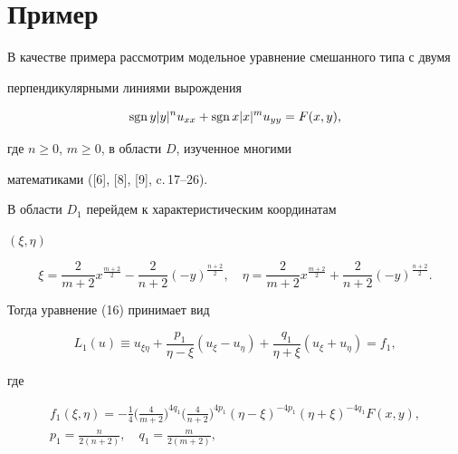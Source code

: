 \section{Пример}





В качестве примера рассмотрим модельное уравнение смешанного типа с двумя 


перпендикулярными линиями вырождения


\begin{equation}


\sgn y|y|^nu_{xx}+\sgn x|x|^mu_{yy}=F(x,y),


\end{equation}


где $n\ge 0$, $m\ge 0$, в области $D$, изученное многими


математиками ([6], [8], [9], c.\,17--26).





В области $D_1$ перейдем к характеристическим координатам


$(\xi,\eta)$


$$


\xi=\frac{2}{m+2}x^{\frac{m+2}{2}}-\frac{2}{n+2}


(-y)^{\frac{n+2}{2}},\quad \eta 


=\frac{2}{m+2}x^{\frac{m+2}{2}}+\frac{2}{n+2}(-y)^{\frac{n+2}{2}}.


$$


Тогда уравнение (16) принимает вид 


\begin{equation}


L_1(u)\equiv u_{\xi \eta }+\frac{p_1}{\eta -\xi }(u_{\xi 


}-u_{\eta })+\frac{q_1}{\eta +\xi }(u_{\xi }+u_{\eta 


})=f_1,


\end{equation}


где


\begin{gather*}


f_1(\xi,\eta)=-\frac{1}{4}\bigg(\frac{4}{m+2}\bigg)^{4q_1}\bigg 


(\frac{4}{n+2}\bigg)^{4p_1}(\eta-\xi)^{-4p_1}(\eta +\xi)^{-4q_1}F(x,y), \\


%


p_1=\frac{n}{2(n+2)},\quad q_1=\frac{m}{2(m+2)},


\end{gather*}


